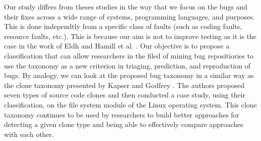 Our study differs from theses studies in the way that we focus on the bugs and their fixes across a wide range of systems, programming languages, and purposes.
This is done independtly from a specific class of faults (such as coding faults, resource faults, etc.).
This is because our aim is not to improve testing as it is the case in the work of Eldh \cite{Eldh2001} and Hamill et al.
\cite{Hamill2014}.
Our objective is to propose a classification that can allow researchers in the filed of mining bug repositiories to use the taxonomy as a new criterion in triaging, prediction, and reproduction of bugs.
By analogy, we can look at the proposed bug taxonomy in a similar way as the clone taxonomy presented by Kapser and Godfrey \cite{CoryKapser}.
The authors proposed seven types of source code clones and then conducted a case study, using their classification, on the file system module of the Linux operating system.
This clone taxonomy continues to be used by researchers to build better approaches for detecting a given clone type and being able to effectively compare approaches with each other.

